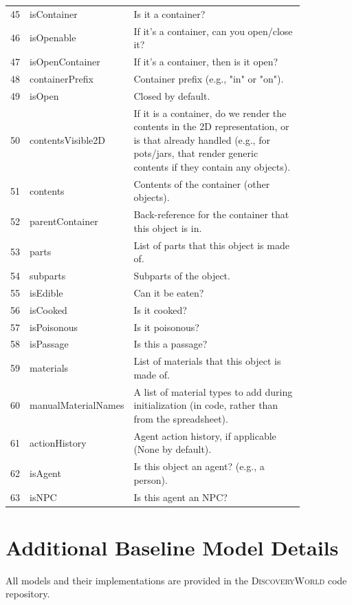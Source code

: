 \documentclass{article}
\newcommand{\env}{\textsc{DiscoveryWorld}\xspace}
\begin{document}
\begin{table}[t!]
\begin{tabular}{cp{0.20\linewidth}p{0.65\linewidth}}
45 & isContainer & Is it a container? \\
46 & isOpenable & If it's a container, can you open/close it? \\
47 & isOpenContainer & If it's a container, then is it open? \\
48 & containerPrefix & Container prefix (e.g., "in" or "on"). \\
49 & isOpen & Closed by default. \\
50 & contentsVisible2D & If it is a container, do we render the contents in the 2D representation, or is that already handled (e.g., for pots/jars, that render generic contents if they contain any objects). \\
51 & contents & Contents of the container (other objects). \\
52 & parentContainer & Back-reference for the container that this object is in. \\
53 & parts & List of parts that this object is made of. \\
54 & subparts & Subparts of the object. \\
55 & isEdible & Can it be eaten? \\
56 & isCooked & Is it cooked? \\
57 & isPoisonous & Is it poisonous? \\
58 & isPassage & Is this a passage? \\
59 & materials & List of materials that this object is made of. \\
60 & manualMaterialNames & A list of material types to add during initialization (in code, rather than from the spreadsheet). \\
61 & actionHistory & Agent action history, if applicable (None by default). \\
62 & isAgent & Is this object an agent? (e.g., a person). \\
63 & isNPC & Is this agent an NPC? \\
\bottomrule
\end{tabular}
\end{table}



\clearpage
\section{Additional Baseline Model Details}
\label{sec:appendix-additional-model-details}

All models and their implementations are provided in the \env code repository. 
\end{document}
